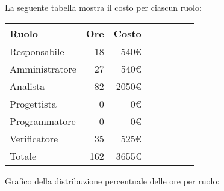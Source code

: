 La seguente tabella mostra il costo per ciascun ruolo:
\begin{table}[ht]
    \begin{tabularx}{\linewidth}{X|rrrrrrr}
    \rowcolor{gray!30}Ruolo & Ore & Costo \\
    \hline
    Responsabile                            & 18 & 540€ \\
    \rowcolor{gray!10}Amministratore        & 27 & 540€ \\
    Analista                                & 82 & 2050€ \\
    \rowcolor{gray!10}Progettista           & 0 & 0€ \\
    Programmatore                           & 0 & 0€ \\
    \rowcolor{gray!10}Verificatore          & 35 & 525€ \\
    \hline Totale                           & 162 & 3655€ \\ 
    \end{tabularx}
\end{table}

Grafico della distribuzione percentuale delle ore per ruolo:
\begin{center}
\end{center}